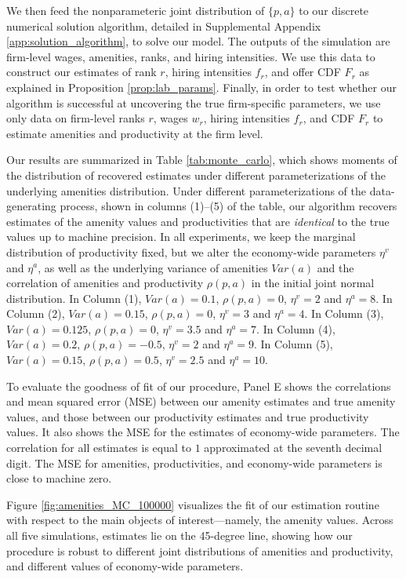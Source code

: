 We then feed the nonparameteric joint distribution of $\{p, a\}$ to our discrete numerical solution algorithm, detailed in Supplemental Appendix \ref{app:solution_algorithm}, to solve our model. The outputs of the simulation are firm-level wages, amenities, ranks, and hiring intensities. We use this data to construct our estimates of rank $r$, hiring intensities $f_r$, and offer CDF $F_r$ as explained in Proposition \ref{prop:lab_params}. Finally, in order to test whether our algorithm is successful at uncovering the true firm-specific parameters, we use only data on firm-level ranks $r$, wages $w_r$, hiring intensities $f_r$, and CDF $F_r$ to estimate amenities and productivity at the firm level.

Our results are summarized in Table \ref{tab:monte_carlo}, which shows moments of the distribution of recovered estimates under different parameterizations of the underlying amenities distribution. Under different parameterizations of the data-generating process, shown in columns (1)--(5) of the table, our algorithm recovers estimates of the amenity values and productivities that are {\it{identical}} to the true values up to machine precision. In all experiments, we keep the marginal distribution of productivity fixed, but we alter the economy-wide parameters $\eta^{v}$ and $\eta^a$, as well as the underlying variance of amenities $Var(a)$ and the correlation of amenities and productivity $\rho(p, a)$ in the initial joint normal distribution. %
%
In Column (1), $Var(a) = 0.1$, $\rho(p,a) = 0$, $\eta^{v} = 2$ and $\eta^{a} = 8$. In Column (2), $Var(a) = 0.15$, $\rho(p,a) = 0$, $\eta^{v} = 3$ and $\eta^{a} = 4$. In Column (3), $Var(a) = 0.125$, $\rho(p,a) = 0$, $\eta^{v} = 3.5$ and $\eta^{a} = 7$. In Column (4), $Var(a) = 0.2$, $\rho(p,a) = -0.5$, $\eta^{v} = 2$ and $\eta^{a} = 9$. In Column (5), $Var(a) = 0.15$, $\rho(p,a) = 0.5$, $\eta^{v} = 2.5$ and $\eta^{a} = 10$.

To evaluate the goodness of fit of our procedure, Panel E shows the correlations and mean squared error (MSE) between our amenity estimates and true amenity values, and those between our productivity estimates and true productivity values. It also shows the MSE for the estimates of economy-wide parameters. The correlation for all estimates is equal to $1$ approximated at the seventh decimal digit. The MSE for amenities, productivities, and economy-wide parameters is close to machine zero.

Figure \ref{fig:amenities_MC_100000} visualizes the fit of our estimation routine with respect to the main objects of interest---namely, the amenity values. Across all five simulations, estimates lie on the 45-degree line, showing how our procedure is robust to different joint distributions of amenities and productivity, and different values of economy-wide parameters.

